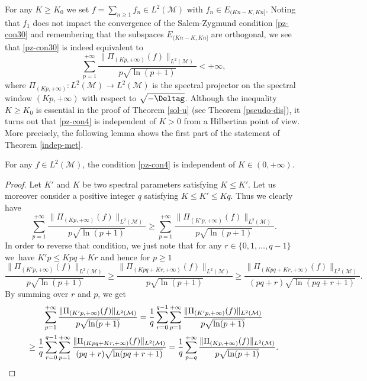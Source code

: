 For any $K\geq K_0$ we set $f=\sum_{n\geq 1} f_n\in L^2(\mathcal{M})$ with $f_n\in E_{(Kn-K,Kn]}$. Noting that $f_1$ does not impact the convergence of the Salem-Zygmund condition \eqref{pz-con30} and remembering that the subspaces $E_{(Kn-K,Kn]}$ are orthogonal, we see that \eqref{pz-con30} is indeed equivalent to
\begin{equation}\label{pz-con4}
\sum_{p=1}^{+\infty} \frac{\|\Pi_{(Kp,+\infty)}(f)\|_{L^2(\mathcal{M})}}{p\sqrt{\ln(p+1)}}<+\infty,
\end{equation}
where $\Pi_{(Kp,+\infty)}:L^2(\mathcal{M})\to L^2(\mathcal{M})$ is the spectral projector on the spectral window $(Kp,+\infty)$ with respect to $\sqrt{-\Deltag}$.
Although the inequality $K\geq K_0$ is essential in the proof of Theorem \ref{sol-u} (see Theorem \ref{pseudo-dis}), it turns out that \eqref{pz-con4} is independent of $K>0$ from a Hilbertian point of view. More precisely, the following lemma shows the first part of the statement of Theorem \ref{indep-met}.
\begin{lemm}\label{wrtK}
For any $f\in L^2(\mathcal{M})$, the condition \eqref{pz-con4} is independent of $K\in (0,+\infty)$.
\end{lemm}
\begin{proof}
Let $K'$ and $K$ be two spectral parameters satisfying $K\leq K'$. Let us moreover consider a positive integer $q$ satisfying $K\leq K'\leq Kq$.
Thus we clearly have
\begin{equation*}
\sum_{p=1}^{+\infty} \frac{\|\Pi_{(Kp,+\infty)}(f)\|_{L^2(\mathcal{M})}}{p\sqrt{\ln(p+1)}}\geq \sum_{p=1}^{+\infty} \frac{\|\Pi_{(K'p,+\infty)}(f)\|_{L^2(\mathcal{M})}}{p\sqrt{\ln(p+1)}}.
\end{equation*}
In order to reverse that condition, we just note that for any $r\in \{0,1,\dots,q-1\}$ we~have $K'p\leq Kpq+Kr$ and hence for $p\geq 1$
\begin{equation*}
\frac{\|\Pi_{(K'p,+\infty)}(f)\|_{L^2(\mathcal{M})}}{p\sqrt{\ln(p+1)}} \geq \frac{\|\Pi_{(Kpq+Kr,+\infty)}(f)\|_{L^2(\mathcal{M})}}{p\sqrt{\ln(p+1)}} \geq \frac{\|\Pi_{(Kpq+Kr,+\infty)}(f)\|_{L^2(\mathcal{M})}}{(pq+r)\sqrt{\ln(pq+r+1)}} .
\end{equation*}
By summing over $r$ and $p$, we get
\begin{multline*}
\sum_{p=1}^{+\infty} \frac{\|\Pi_{(K'p,+\infty)}(f)\|_{L^2(\mathcal{M})}}{p\sqrt{\ln(p+1)}} =\frac{1}{q}\sum_{r=0}^{q-1} \sum_{p=1}^{+\infty} \frac{\|\Pi_{(K'p,+\infty)}(f)\|_{L^2(\mathcal{M})}}{p\sqrt{\ln(p+1)}}\\
\geq \frac{1}{q}\sum_{r=0}^{q-1} \sum_{p=1}^{+\infty}\frac{\|\Pi_{(Kpq+Kr,+\infty)}(f)\|_{L^2(\mathcal{M})}}{(pq+r)\sqrt{\ln(pq+r+1)}}=\frac{1}{q} \sum_{p=q}^{+\infty} \frac{\|\Pi_{(Kp,+\infty)}(f)\|_{L^2(\mathcal{M})}}{p\sqrt{\ln(p+1)}}.\qedhere
\end{multline*}
\end{proof}


